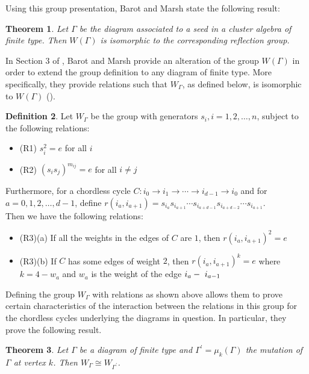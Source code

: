 \documentclass[11pt]{amsart}
\newtheorem{thm}{Theorem}[section]
\theoremstyle{definition}
\newtheorem{defn}[thm]{Definition}
\begin{document}
Using this group presentation, Barot and Marsh state the following result:
\begin{thm}\label{thm:barot_and_marsh_A}\cite[Theorem A]{BM13}
Let $\Gamma$ be the diagram associated to a seed in a cluster algebra of finite type. Then $W(\Gamma)$ is isomorphic to the corresponding reflection group.
\end{thm}

In Section 3 of \cite{BM13}, Barot and Marsh provide an alteration of the group $W(\Gamma)$ in order to extend the group definition to any diagram of finite type. More specifically, they provide relations such that $W_{\Gamma}$, as defined below, is isomorphic to $W(\Gamma)$ (\cite[Proposition 4.5]{BM13}).

\begin{defn}
Let $W_{\Gamma}$ be the group with generators $s_i, i = 1,2,\ldots, n$, subject to the following relations:
\begin{itemize}
\item{(R1)} $s_i^2 = e$ for all $i$
\item{(R2)} $\left(s_is_j\right)^{m_{ij}} = e$ for all $i \neq j$
\end{itemize}
Furthermore, for a chordless cycle $C : i_0 \rightarrow i_1 \rightarrow \cdots \rightarrow i_{d-1} \rightarrow i_0$ and for $a = 0,1,2,\ldots, d-1$, define \textbf{$r\left(i_a, i_{a+1}\right) = s_{i_a}s_{i_{a+1}} \cdots s_{i_{a+d-1}}s_{i_{a+d-2}} \cdots s_{i_{a+1}}$}.\\

\vspace{0.1cm}
Then we have the following relations:
\begin{itemize}
\item{(R3)(a)} If all the weights in the edges of $C$ are $1$, then $r(i_a, i_{a+1})^2 = e$
\item{(R3)(b)} If $C$ has some edges of weight $2$, then $r(i_a, i_{a+1})^k = e$ where $k = 4-w_a$ and $w_a$ is the weight of the edge $i_a\--\ i_{a-1}$
\end{itemize}
\end{defn}

Defining the group $W_{\Gamma}$ with relations as shown above allows them to prove certain characteristics of the interaction between the relations in this group for the chordless cycles underlying the diagrams in question. In particular, they prove the following result.
\begin{thm}\cite[Theorem 5.4a]{BM13}
Let $\Gamma$ be a diagram of finite type and $\Gamma^{\prime} = \mu_k(\Gamma)$ the mutation of $\Gamma$ at vertex $k$. Then $W_{\Gamma} \cong W_{\Gamma^{\prime}}$.
\end{thm}
\end{document}
